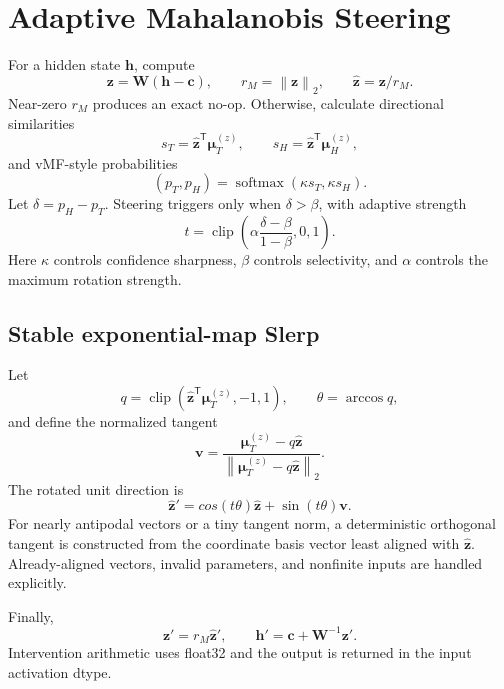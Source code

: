 \documentclass[11pt]{article}
\newcommand{\mTz}{\bm{\mu}^{(z)}_{T}}
\newcommand{\mHz}{\bm{\mu}^{(z)}_{H}}
\newcommand{\norm}[1]{\left\lVert #1\right\rVert_2}
\newcommand{\trans}{^{\mathsf T}}
\begin{document}
\section{Adaptive Mahalanobis Steering}

For a hidden state $\bm h$, compute
\begin{equation}
  \bm z=\bm W(\bm h-\bm c),
  \qquad r_M=\norm{\bm z},
  \qquad \widehat{\bm z}=\bm z/r_M.
\end{equation}
Near-zero $r_M$ produces an exact no-op.  Otherwise, calculate directional
similarities
\begin{equation}
  s_T=\widehat{\bm z}\trans\mTz,
  \qquad s_H=\widehat{\bm z}\trans\mHz,
\end{equation}
and vMF-style probabilities
\begin{equation}
  (p_T,p_H)=\operatorname{softmax}(\kappa s_T,\kappa s_H).
\end{equation}
Let $\delta=p_H-p_T$.  Steering triggers only when $\delta>\beta$, with
adaptive strength
\begin{equation}
  t=\operatorname{clip}\left(
  \alpha\frac{\delta-\beta}{1-\beta},0,1\right).
\end{equation}
Here $\kappa$ controls confidence sharpness, $\beta$ controls selectivity, and
$\alpha$ controls the maximum rotation strength.

\subsection{Stable exponential-map Slerp}

Let
\begin{equation}
 q=\operatorname{clip}(\widehat{\bm z}\trans\mTz,-1,1),
 \qquad \theta=\arccos q,
\end{equation}
and define the normalized tangent
\begin{equation}
  \bm v=\frac{\mTz-q\widehat{\bm z}}
  {\norm{\mTz-q\widehat{\bm z}}}.
\end{equation}
The rotated unit direction is
\begin{equation}
  \widehat{\bm z}'=cos(t\theta)\widehat{\bm z}
  +\sin(t\theta)\bm v.
\end{equation}
For nearly antipodal vectors or a tiny tangent norm, a deterministic orthogonal
tangent is constructed from the coordinate basis vector least aligned with
$\widehat{\bm z}$.  Already-aligned vectors, invalid parameters, and nonfinite
inputs are handled explicitly.

Finally,
\begin{equation}
  \bm z'=r_M\widehat{\bm z}',
  \qquad
  \bm h'=\bm c+\bm W^{-1}\bm z'.
\end{equation}
Intervention arithmetic uses float32 and the output is returned in the input
activation dtype.
\end{document}
